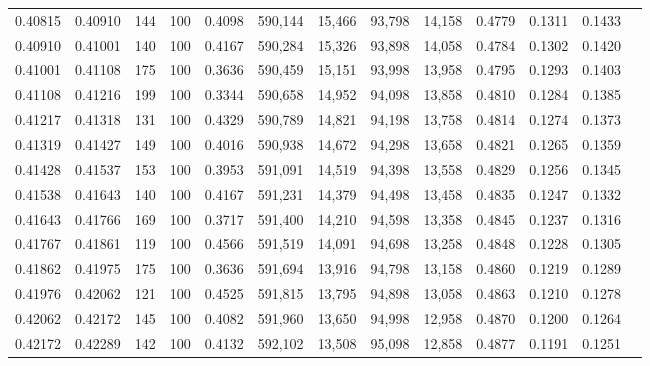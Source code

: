 \begin{tabular}{rrrrrrrrrrrrr}
0.40815 & 0.40910 &   144 & 100 &                                     0.4098 & 590,144 &  15,466 &  93,798 &  14,158 & 0.4779 & 0.1311 & 0.1433 \\
0.40910 & 0.41001 &   140 & 100 &                                     0.4167 & 590,284 &  15,326 &  93,898 &  14,058 & 0.4784 & 0.1302 & 0.1420 \\
0.41001 & 0.41108 &   175 & 100 &                                     0.3636 & 590,459 &  15,151 &  93,998 &  13,958 & 0.4795 & 0.1293 & 0.1403 \\
0.41108 & 0.41216 &   199 & 100 &                                     0.3344 & 590,658 &  14,952 &  94,098 &  13,858 & 0.4810 & 0.1284 & 0.1385 \\
0.41217 & 0.41318 &   131 & 100 &                                     0.4329 & 590,789 &  14,821 &  94,198 &  13,758 & 0.4814 & 0.1274 & 0.1373 \\
0.41319 & 0.41427 &   149 & 100 &                                     0.4016 & 590,938 &  14,672 &  94,298 &  13,658 & 0.4821 & 0.1265 & 0.1359 \\
0.41428 & 0.41537 &   153 & 100 &                                     0.3953 & 591,091 &  14,519 &  94,398 &  13,558 & 0.4829 & 0.1256 & 0.1345 \\
0.41538 & 0.41643 &   140 & 100 &                                     0.4167 & 591,231 &  14,379 &  94,498 &  13,458 & 0.4835 & 0.1247 & 0.1332 \\
0.41643 & 0.41766 &   169 & 100 &                                     0.3717 & 591,400 &  14,210 &  94,598 &  13,358 & 0.4845 & 0.1237 & 0.1316 \\
0.41767 & 0.41861 &   119 & 100 &                                     0.4566 & 591,519 &  14,091 &  94,698 &  13,258 & 0.4848 & 0.1228 & 0.1305 \\
0.41862 & 0.41975 &   175 & 100 &                                     0.3636 & 591,694 &  13,916 &  94,798 &  13,158 & 0.4860 & 0.1219 & 0.1289 \\
0.41976 & 0.42062 &   121 & 100 &                                     0.4525 & 591,815 &  13,795 &  94,898 &  13,058 & 0.4863 & 0.1210 & 0.1278 \\
0.42062 & 0.42172 &   145 & 100 &                                     0.4082 & 591,960 &  13,650 &  94,998 &  12,958 & 0.4870 & 0.1200 & 0.1264 \\
0.42172 & 0.42289 &   142 & 100 &                                     0.4132 & 592,102 &  13,508 &  95,098 &  12,858 & 0.4877 & 0.1191 & 0.1251 \\

\end{tabular}
